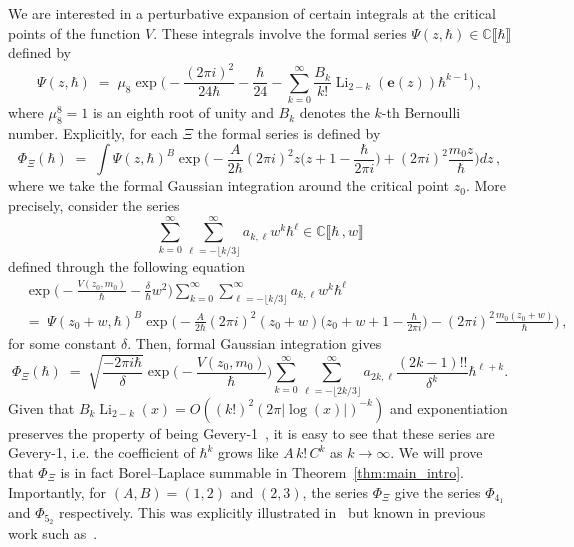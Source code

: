 \documentclass[12pt,reqno]{amsart}
\theoremstyle{definition}
\def\BC{\mathbb C}
\def\be{\begin{equation}}
\def\ee{\end{equation}}
\def\e{\mathbf e}
\renewcommand{\=}{\;=\;}
\newcommand{\Li}{\operatorname{Li}}
\begin{document}
We are interested in a perturbative expansion of certain integrals at the critical points of the function $V$. These integrals involve the formal series $\Psi(z,\hbar)\in\BC\llbracket\hbar\rrbracket$ defined by
\be
  \Psi(z,\hbar)
  \=
  \mu_8\exp\Big(-\frac{(2\pi i)^2}{24\hbar}-\frac{\hbar}{24}-\sum_{k=0}^{\infty}\frac{B_{k}}{k!}\Li_{2-k}(\e(z))\hbar^{k-1}\Big)\,,
\ee
where $\mu_8^8=1$ is an eighth root of unity and $B_k$ denotes the $k$-th Bernoulli number. Explicitly, for each $\Xi$ the formal series is defined by
\be\label{eq:form.int}
  \Phi_{\Xi}(\hbar)\=\int \Psi(z,\hbar)^B\exp\Big(-\frac{A}{2\hbar}(2\pi i)^2z\Big(z+1-\frac{\hbar}{2\pi i}\Big)+(2\pi i)^2\frac{m_0z}{\hbar}\Big)dz\,,
\ee
where we take the formal Gaussian integration around the critical point $z_0$. More precisely, consider the series
\be
\sum_{k=0}^{\infty}\sum_{\ell=-\lfloor k/3\rfloor}^{\infty}a_{k,\ell}w^k\hbar^\ell\in\BC\llbracket\hbar\,,w\rrbracket
\ee
defined through the following equation
\be
\begin{aligned}
  &\exp\Big(-\frac{V(z_0,m_0)}{\hbar}-\frac{\delta}{\hbar} w^2\Big)
  \sum_{k=0}^{\infty}\sum_{\ell=-\lfloor k/3\rfloor}^{\infty}a_{k,\ell}w^k\hbar^\ell\\
  &=\;
  \Psi(z_0+w,\hbar)^B\exp\Big(-\frac{A}{2\hbar}(2\pi i)^2(z_0+w)\Big(z_0+w+1-\frac{\hbar}{2\pi i}\Big)-(2\pi i)^2\frac{m_0(z_0+w)}{\hbar}\Big)\,,
\end{aligned}
\ee
for some constant $\delta$. 
Then, formal Gaussian integration gives
\be\label{eq:def.phi}
  \Phi_{\Xi}(\hbar)\=
  \sqrt{\frac{-2\pi i\hbar}{\delta}}
  \exp\Big(-\frac{V(z_0,m_0)}{\hbar}\Big)
  \sum_{k=0}^{\infty}\sum_{\ell=-\lfloor 2k/3\rfloor}^{\infty}a_{2k,\ell}\frac{(2k-1)!!}{\delta^k}\hbar^{\ell+k}.
\ee
Given that $B_{k}\Li_{2-k}(x)=O((k!)^2(2\pi|\log(x)|)^{-k})$ and exponentiation preserves the property of being Gevery-1~\cite[Thm.~5.55]{diverg-resurg-i}, it is easy to see that these series are Gevery-1, i.e. the coefficient of $\hbar^k$ grows like $A\,k!\,C^k$ as $k\to\infty$. We will prove that $\Phi_{\Xi}$ is in fact Borel--Laplace summable in Theorem~\ref{thm:main_intro}. Importantly, for $(A,B)=(1,2)$ and $(2,3)$, the series $\Phi_{\Xi}$ give the series $\Phi_{4_1}$ and $\Phi_{5_2}$ respectively. This was explicitly illustrated in~\cite[Sec.~7]{GSW} but known in previous work such as~\cite[Sec.~1.3]{GK:qser}.
%
%
%
\end{document}
